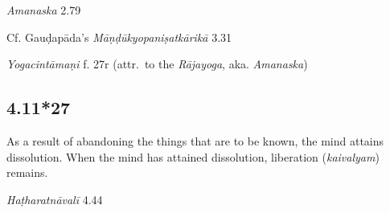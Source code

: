 \begin{ekdosis}
\begin{sources}[hp04_011_26]
\emph{Amanaska} 2.79
\begin{versinnote}
\end{versinnote}

Cf. Gauḍapāda's \emph{Māṇḍūkyopaniṣatkārikā} 3.31
\begin{versinnote}
\end{versinnote}

\end{sources}

\begin{testimonia}[hp04_011_26]
\emph{Yogacintāmaṇi} f. 27r (attr.~to the \emph{Rājayoga}, aka. \emph{Amanaska})
\begin{versinnote}
\end{versinnote}
\end{testimonia}


\subsection*{4.11*27}
\begin{translation}[hp04_011_27]
As a result of abandoning the things that are to be known, the mind attains dissolution. When the mind has attained dissolution, liberation (\textit{kaivalyam}) remains.
\end{translation} %


\begin{testimonia}[hp04_011_27]
\emph{Haṭharatnāvalī} 4.44
\begin{versinnote}
\end{versinnote}
\end{testimonia}


\end{ekdosis}
